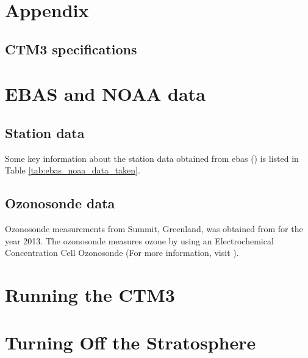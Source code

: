 \appendix
\chapter{Appendix}

\section{CTM3 specifications}\label{app:CTM3}






\cleardoublepage

\chapter{EBAS and NOAA data}\label{app:ebas_noaa_data}


\section{Station data}

Some key information about the station data obtained from ebas (\cite{EBAS}) is listed in Table \ref{tab:ebas_noaa_data_taken}. 




\section{Ozonosonde data}

Ozonosonde measurements from Summit, Greenland, was obtained from \cite{NOAA} for the year 2013. The ozonosonde measures ozone by using an Electrochemical Concentration Cell Ozonosonde (For more information, visit \cite{ESRL}).  

\cleardoublepage

\chapter{Running the CTM3}\label{app:running_CTM3}

\cleardoublepage

\chapter{Turning Off the Stratosphere}\label{app:turning_off_the_stratosphere}



